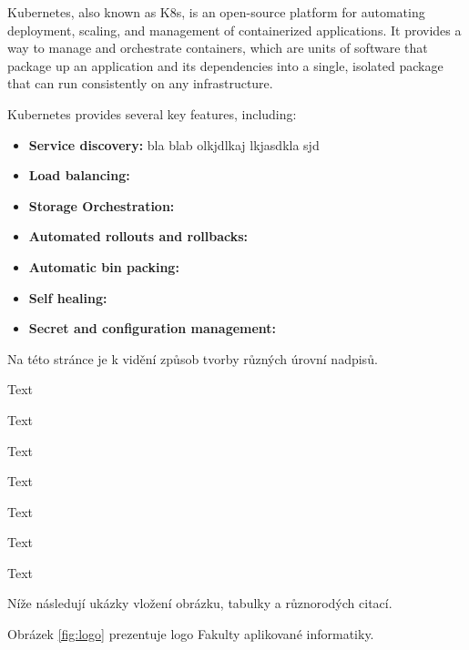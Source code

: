 
Kubernetes, also known as K8s, is an open-source platform for automating deployment, scaling, and management of containerized applications. It provides a way to manage and orchestrate containers, which are units of software that package up an application and its dependencies into a single, isolated package that can run consistently on any infrastructure. \cite{vayghan2019kubernetes}

Kubernetes provides several key features, including:
\begin{itemize}
\item \textbf{Service discovery:} bla blab olkjdlkaj lkjasdkla sjd
\item \textbf{Load balancing:}
\item \textbf{Storage Orchestration:}
\item \textbf{Automated rollouts and rollbacks:}
\item \textbf{Automatic bin packing:}
\item \textbf{Self healing:}
\item \textbf{Secret and configuration management:}
\end{itemize}










Na této stránce je k vidění způsob tvorby různých úrovní nadpisů.

Text

Text

Text

Text

Text

Text

Text


Níže následují ukázky vložení obrázku, tabulky a různorodých citací.


Obrázek \ref{fig:logo} prezentuje logo Fakulty aplikované informatiky.

